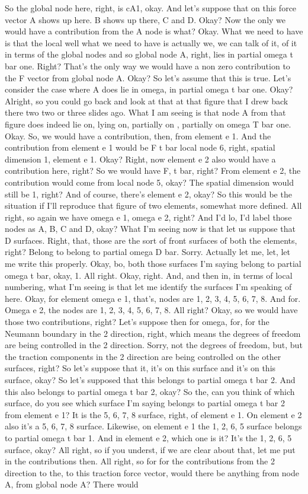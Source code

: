\documentclass[10pt]{article}
\begin{document}
So the global node here, right, is cA1, okay. And let's suppose that on this force vector A shows up here. B shows up there, C and D. Okay? Now the only we would have a contribution from the A node is what? Okay. What we need to have is that the local well what we need to have is actually we, we can talk of it, of it in terms of the global nodes and so global node A, right, lies in partial omega t bar one. Right? That's the only way we would have a non zero contribution to the F vector from global node A. Okay? So let's assume that this is true. Let's consider the case where A does lie in omega, in partial omega t bar one. Okay? Alright, so you could go back and look at that at that figure that I drew back there two two or three slides ago. What I am seeing is that node A from that figure does indeed lie on, lying on, partially on , partially on omega T bar one. Okay. So, we would have a contribution, then, from element e 1. And the contribution from element e 1 would be F t bar local node 6, right, spatial dimension 1, element e 1. Okay? Right, now element e 2 also would have a contribution here, right? So we would have F, t bar, right? From element e 2, the contribution would come from local node 5, okay? The spatial dimension would still be 1, right? And of course, there's element e 2, okay? So this would be the situation if I'll reproduce that figure of two elements, somewhat more defined. All right, so again we have omega e 1, omega e 2, right? And I'd lo, I'd label those nodes as A, B, C and D, okay? What I'm seeing now is that let us suppose that D surfaces. Right, that, those are the sort of front surfaces of both the elements, right? Belong to belong to partial omega D bar. Sorry. Actually let me, let, let me write this properly. Okay, bo, both those surfaces I'm saying belong to partial omega t bar, okay, 1. All right. Okay, right. And, and then in, in terms of local numbering, what I'm seeing is that let me identify the surfaces I'm speaking of here. Okay, for element omega e 1, that's, nodes are 1, 2, 3, 4, 5, 6, 7, 8. And for. Omega e 2, the nodes are 1, 2, 3, 4, 5, 6, 7, 8. All right? Okay, so we would have those two contributions, right? Let's suppose then for omega, for, for the Neumann boundary in the 2 direction, right, which means the degrees of freedom are being controlled in the 2 direction. Sorry, not the degrees of freedom, but, but the traction components in the 2 direction are being controlled on the other surfaces, right? So let's suppose that it, it's on this surface and it's on this surface, okay? So let's supposed that this belongs to partial omega t bar 2. And this also belongs to partial omega t bar 2, okay? So the, can you think of which surface, do you see which surface I'm saying belongs to partial omega t bar 2 from element e 1? It is the 5, 6, 7, 8 surface, right, of element e 1. On element e 2 also it's a 5, 6, 7, 8 surface. Likewise, on element e 1 the 1, 2, 6, 5 surface belongs to partial omega t bar 1. And in element e 2, which one is it? It's the 1, 2, 6, 5 surface, okay? All right, so if you underst, if we are clear about that, let me put in the contributions then. All right, so for for the contributions from the 2 direction to the, to this traction force vector, would there be anything from node A, from global node A? There would 
\end{document}
